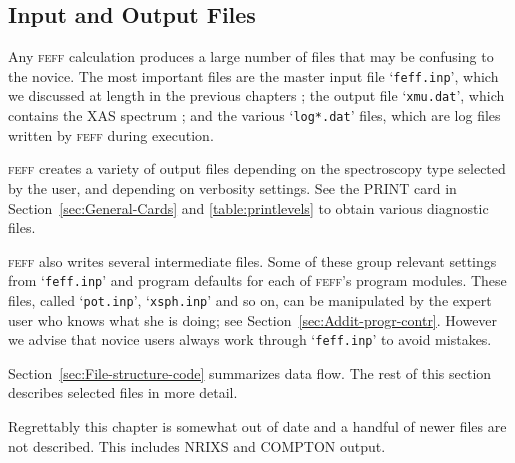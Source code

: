 \documentclass[11pt,oneside]{report} %
\renewcommand{\htmlref}[2]{\hyperlink{#2}{#1}}
\newcommand{\program}[1]{\textsc{#1}}
\newcommand{\feff}{\program{feff}}
\newcommand{\file}[1]{`\texttt{#1}'}
\renewcommand{\htmlref}[2]{{#1}} %
\begin{document}
\begin{latexonly}%

\chapter{Input and Output Files}
\label{sec:Input-and-Output-Files}

Any {\feff} calculation produces a large number of files that may be confusing to the novice.  
The most important files are the master input file \file{feff.inp}, which we discussed at length in the previous chapters ;
the output file \file{xmu.dat}, which contains the XAS spectrum ; and the various \file{log*.dat} files, which are log files
written by {\feff} during execution.  


{\feff} creates a variety of output files depending on the spectroscopy type selected by the user, and depending on verbosity settings.
See the \htmlref{PRINT}{card:pri} card in Section~\ref{sec:General-Cards} and \ref{table:printlevels} to obtain various diagnostic files.

{\feff} also writes several intermediate files.  Some of these group relevant settings from \file{feff.inp} and program defaults for each of 
{\feff}'s program modules.  These files, called \file{pot.inp}, \file{xsph.inp} and so on, can be manipulated by the expert user who knows what she is doing; see Section~\ref{sec:Addit-progr-contr}.
However we advise that novice users always work through \file{feff.inp} to avoid mistakes. 

Section~\ref{sec:File-structure-code} summarizes data flow.  The rest of this section describes selected files in more detail.

Regrettably this chapter is somewhat out of date and a handful of newer files are not described.  This includes NRIXS and COMPTON output.


\end{latexonly}
\end{document}
